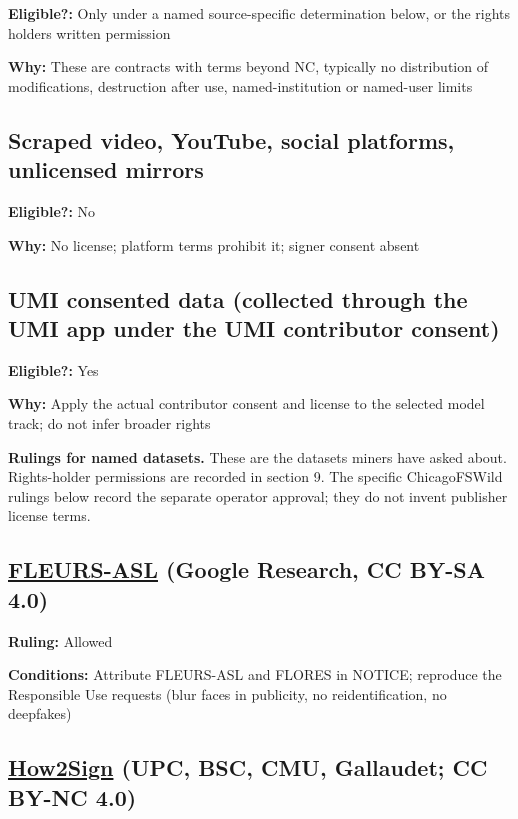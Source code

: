 \documentclass[10pt,a4paper]{article}
\begin{document}
\textbf{Eligible?:} Only under a named source-specific determination
below, or the rights holder\textquotesingle s written permission

\textbf{Why:} These are contracts with terms beyond NC, typically no
distribution of modifications, destruction after use, named-institution
or named-user limits

\subsection{Scraped video, YouTube, social platforms, unlicensed
mirrors}\label{scraped-video-youtube-social-platforms-unlicensed-mirrors}

\textbf{Eligible?:} No

\textbf{Why:} No license; platform terms prohibit it; signer consent
absent

\subsection{UMI consented data (collected through the UMI app under the
UMI contributor
consent)}\label{umi-consented-data-collected-through-the-umi-app-under-the-umi-contributor-consent}

\textbf{Eligible?:} Yes

\textbf{Why:} Apply the actual contributor consent and license to the
selected model track; do not infer broader rights

\textbf{Rulings for named datasets.} These are the datasets miners have
asked about. Rights-holder permissions are recorded in section 9. The
specific ChicagoFSWild rulings below record the separate operator
approval; they do not invent publisher license terms.

\subsection{\texorpdfstring{\href{https://www.kaggle.com/datasets/googleai/fleurs-asl}{FLEURS-ASL}
(Google Research, CC BY-SA
4.0)}{FLEURS-ASL (Google Research, CC BY-SA 4.0)}}\label{fleurs-asl-google-research-cc-by-sa-40}

\textbf{Ruling:} Allowed

\textbf{Conditions:} Attribute FLEURS-ASL and FLORES in NOTICE;
reproduce the Responsible Use requests (blur faces in publicity, no
reidentification, no deepfakes)

\subsection{\texorpdfstring{\href{https://how2sign.github.io/}{How2Sign}
(UPC, BSC, CMU, Gallaudet; CC BY-NC
4.0)}{How2Sign (UPC, BSC, CMU, Gallaudet; CC BY-NC 4.0)}}\label{how2sign-upc-bsc-cmu-gallaudet-cc-by-nc-40}
\end{document}
